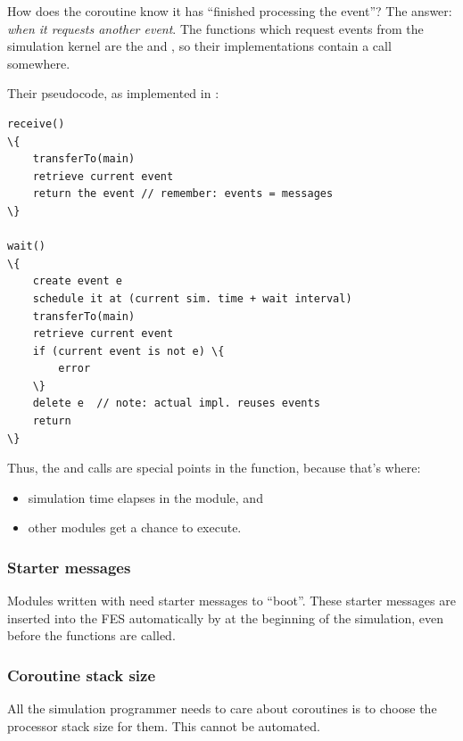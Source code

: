 How does the coroutine know it has ``finished processing the event''?
The answer: \textit{when it requests another event}.  The functions
which request events from the simulation kernel are the
 and , so their
implementations contain a  call
somewhere.


Their pseudocode, as implemented in {\opp}:


\begin{Verbatim}[commandchars=\\\{\}]
receive()
\{
    transferTo(main)
    retrieve current event
    return the event // remember: events = messages
\}

wait()
\{
    create event e
    schedule it at (current sim. time + wait interval)
    transferTo(main)
    retrieve current event
    if (current event is not e) \{
        error
    \}
    delete e  // note: actual impl. reuses events
    return
\}
\end{Verbatim}



Thus, the  and  calls are
special points in the  function, because that's
where:

\begin{itemize}
  \item{simulation time elapses in the module, and}
  \item{other modules get a chance to execute.}
\end{itemize}


\subsubsection{Starter messages}


Modules written with  need starter
messages to ``boot''.  These starter messages
are inserted into the FES automatically by {\opp} at the
beginning of the simulation, even before the 
functions are called.


\subsubsection{Coroutine stack size}


All the simulation programmer needs to care about coroutines is to
choose the processor stack size for them.
This cannot be automated.

